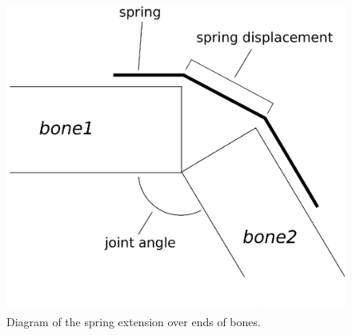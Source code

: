 \documentclass[landscape,26pt]{sciposter}
\begin{document}
\begin{minipage}[t]{14in}
		
	\vspace{0.3in}

	{\footnotesize
	
    \nocite{muscle_based_bipeds}
    \nocite{anim_human_athletics}
    \nocite{composable_controllers}
    \nocite{falling_landing}

    \begin{figure}
        \label{fig:bone_diag}
        \centering
        \includegraphics[height=4in]{spring_angle_calc.eps}
        \caption{Diagram of the spring extension over ends of bones.}
    \end{figure}

	
	}
\end{minipage}
\end{document}
